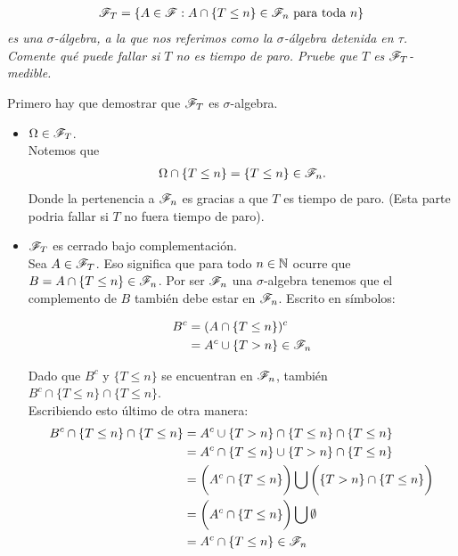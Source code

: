 \emph{
	\begin{align}
		\mathscr{F}_T=\left\{ A\in\mathscr{F}:A\cap\left\{ T\leq n\right\} \in\mathscr{F}_n\text{ para toda } n\right\} 
	\end{align}
	es una $\sigma$-\'algebra, 
	a la que nos referimos como la $\sigma$-\'algebra detenida en $\tau$. Comente qu\'e puede fallar si $T$ no es tiempo de paro. 
	Pruebe que $T$ es $\mathscr{F}_T$-medible.\\		
}			
		
	Primero hay que demostrar que $\mathscr{F}_T$ es $\sigma$-algebra.\\
	
	\begin{itemize}
		\item $\Omega \in \mathscr{F}_T$. \\
		
			Notemos que 
			\begin{align}
				\Omega \cap \{T \leq n\} = \{T \leq n\} \in \mathscr{F}_n.
			\end{align}
			Donde la pertenencia a $\mathscr{F}_n$ es gracias a que $T$ es tiempo de paro. (Esta parte podria fallar si 
			$T$ no fuera tiempo de paro).\\
		
		\item $\mathscr{F}_T$ es cerrado bajo complementación.\\
		
			Sea $A \in \mathscr{F}_T$. Eso significa que para todo $n \in  \mathbb{N}$ ocurre que $B = A \cap \{ T \leq n \} \in \mathscr{F}_n$. 
			Por ser $\mathscr{F}_n$ una $\sigma$-algebra tenemos que el complemento de $B$ también debe estar en $\mathscr{F}_n$. 
			Escrito en símbolos:
			
			\begin{align}
				B^c 	&= (A   \cap \{ T \leq n \})^c \\
						&=  A^c \cup \{ T > n \} \in \mathscr{F}_n
			\end{align}
			
			Dado que $B^c$ y $\{ T \leq n \}$ se encuentran en $\mathscr{F}_n$, también \\
			$B^c \cap \{ T \leq n \} \cap \{ T \leq n \}$.\\
			
			Escribiendo esto último de otra manera:
			\begin{align}
				B^c \cap \{ T \leq n \} \cap \{ T \leq n \} 	&=		A^c \cup \{ T > n \} \cap \{ T \leq n \} \cap \{ T \leq n \} \\
																&= 		A^c \cap \{ T \leq n \} \cup \{ T > n \} \cap \{ T \leq n \} \\
																&= 		\bigg(A^c \cap \{ T \leq n \}\bigg) 
																			\bigcup 
																		\bigg(\{ T > n \} \cap \{ T \leq n \}\bigg) \\
																&=		\bigg(A^c \cap \{ T \leq n \}\bigg)	\bigcup \emptyset \\
																&=		A^c \cap \{ T \leq n \} \in \mathscr{F}_n
			\end{align}
			

\end{itemize}
